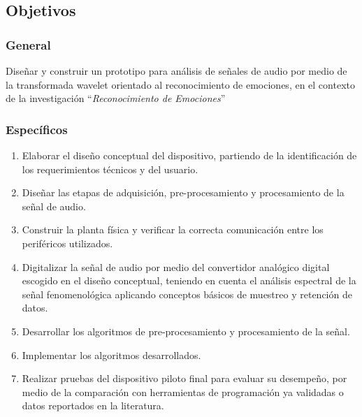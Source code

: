 \documentclass[11pt,lettersize]{article} %
\begin{document}
\subsection{Objetivos}
\subsubsection{General}
Diseñar y construir un prototipo para análisis de señales de audio por medio de la transformada wavelet orientado al reconocimiento de emociones, en el contexto de la investigación ``\emph{Reconocimiento de Emociones}''
\subsubsection{Específicos}
\begin{enumerate}
	\item Elaborar el diseño conceptual del dispositivo, partiendo de la identificación de los requerimientos técnicos y del usuario.
	\item Diseñar las etapas de adquisición, pre-procesamiento y procesamiento de la señal de audio.
	\item Construir la planta física y verificar la correcta comunicación entre los periféricos utilizados.
	\item Digitalizar la señal de audio por medio del convertidor analógico digital escogido en el diseño conceptual, teniendo en cuenta el análisis espectral de la señal fenomenológica aplicando conceptos básicos de muestreo y retención de datos.
	\item Desarrollar los algoritmos de pre-procesamiento y procesamiento de la señal.
	\item Implementar los algoritmos desarrollados.
	\item Realizar pruebas del dispositivo piloto final para evaluar su desempeño, por medio de la comparación con herramientas de programación ya validadas o datos reportados en la literatura.
\end{enumerate}

\end{document}
